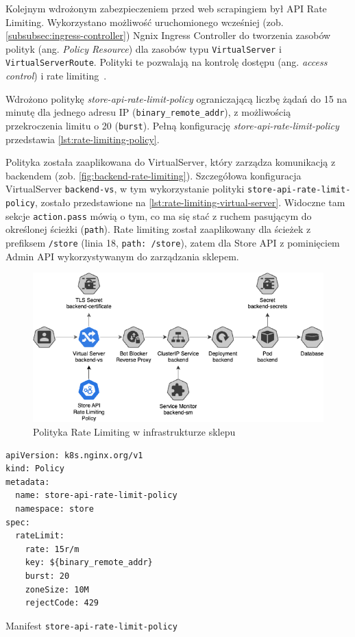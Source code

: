 Kolejnym wdrożonym zabezpieczeniem przed web scrapingiem był API Rate Limiting.
Wykorzystano możliwość uruchomionego wcześniej (zob. \autoref{subsubsec:ingress-controller}) Ngnix Ingress Controller
do tworzenia zasobów polityk (ang. \emph{Policy Resource}) dla zasobów typu \texttt{VirtualServer} i \texttt{VirtualServerRoute}.
Polityki te pozwalają na kontrolę dostępu (ang. \emph{access control}) i rate limiting~\cite{nginx-ingress-controller-policy-resource}.

Wdrożono politykę \emph{store-api-rate-limit-policy} ograniczającą liczbę żądań do 15 na minutę
dla jednego adresu IP (\texttt{binary\_remote\_addr}), z możliwością przekroczenia limitu o 20 (\texttt{burst}).
Pełną konfigurację \emph{store-api-rate-limit-policy} przedstawia \autoref{lst:rate-limiting-policy}.

Polityka została zaaplikowana do VirtualServer, który zarządza komunikacją z backendem (zob. \autoref{fig:backend-rate-limiting}).
Szczegółowa konfiguracja VirtualServer \texttt{backend-vs}, w tym wykorzystanie polityki \texttt{store-api-rate-limit-policy}, zostało przedstawione na \autoref{lst:rate-limiting-virtual-server}.
Widoczne tam sekcje \texttt{action.pass} mówią o tym, co ma się stać z ruchem pasującym do określonej ścieżki (\texttt{path}).
Rate limiting został zaaplikowany dla ścieżek z prefiksem \texttt{/store} (linia 18, \texttt{path: /store}), zatem dla Store API z pominięciem Admin API wykorzystywanym do zarządzania sklepem.


\begin{figure}[H]
    \centering
    \captionsetup{width=.8\linewidth}
    \includegraphics[width=\textwidth]{img/backend-rate-limiting}
    \caption{Polityka Rate Limiting w infrastrukturze sklepu}
    \label{fig:backend-rate-limiting}
\end{figure}

\begin{listing}[p]
    \begin{verbatim}
apiVersion: k8s.nginx.org/v1
kind: Policy
metadata:
  name: store-api-rate-limit-policy
  namespace: store
spec:
  rateLimit:
    rate: 15r/m
    key: ${binary_remote_addr}
    burst: 20
    zoneSize: 10M
    rejectCode: 429
    \end{verbatim}
    \caption{Manifest \texttt{store-api-rate-limit-policy}}
    \label{lst:rate-limiting-policy}
\end{listing}

